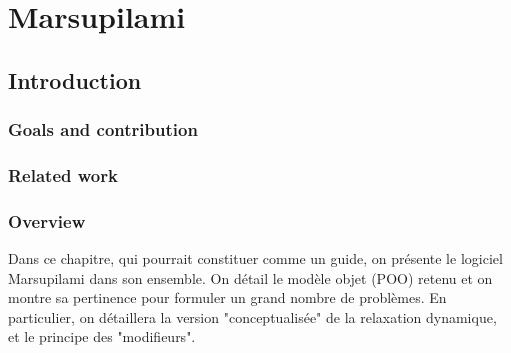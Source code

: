 \chapter{Marsupilami}

\section{Introduction}
\subsection{Goals and contribution}
\subsection{Related work}
\subsection{Overview}
Dans ce chapitre, qui pourrait constituer comme un guide, on présente le logiciel Marsupilami dans son ensemble.
On détail le modèle objet (POO) retenu et on montre sa pertinence pour formuler un grand nombre de problèmes.
En particulier, on détaillera la version "conceptualisée" de la relaxation dynamique, et le principe des "modifieurs".

\cite{Dill1992}



